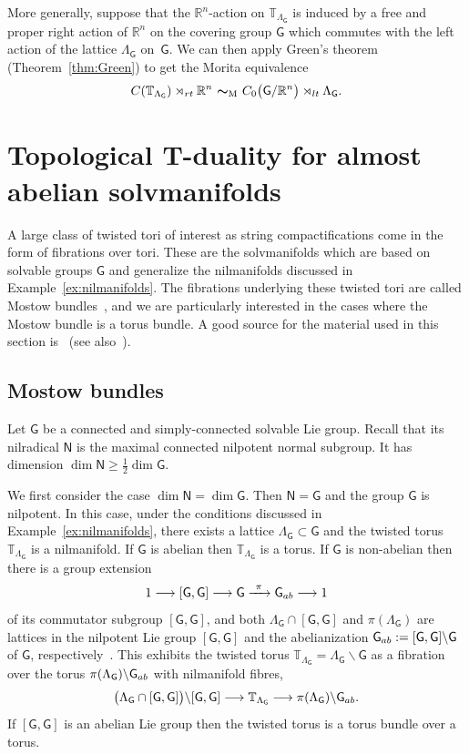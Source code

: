 \documentclass[11pt]{article}
\numberwithin{equation}{section}
\numberwithin{equation}{section}
\newcommand{\mbf}[1]{{\boldsymbol {#1} }}
\newcommand{\sfG}{\mathsf{G}}
\newcommand{\sfN}{\mathsf{N}}
\newcommand{\lt}{{\rm lt}}
\newcommand{\rt}{{\rm rt}}
\newcommand{\real}{{\mathbb R}} %
\newcommand{\torus}{{\mathbb T}} %
\begin{document}
\setcounter{equation}{2}
More generally, suppose that the $\real^n$-action on $\torus_{\Lambda_\sfG}$ is
induced by a free and proper right action of $\real^n$ on the covering group $\sfG$
which commutes with the left action of the lattice $\Lambda_\sfG$ on~$\sfG$. We can then apply Green's theorem
(Theorem~\ref{thm:Green}) to get the Morita
equivalence
\begin{gather}\label{scheme}
C(\torus_{\Lambda_\sfG})\rtimes_\rt \real^n \ \mbf\sim_{\text{\tiny M}} \
C_0\big(\sfG/\real^n\big)\rtimes_\lt \Lambda_\sfG .
\end{gather}

\setcounter{section}{3}
\section{Topological T-duality for almost abelian solvmanifolds}\label{sec:TdualityMostow}

A large class of twisted tori of interest as string compactifications
come in the form of fibrations over tori. These are the solvmanifolds
which are based on solvable groups $\sfG$ and generalize the
nilmanifolds discussed in Example~\ref{ex:nilmanifolds}. The fibrations
underlying these twisted tori are called {Mostow
 bundles}~\cite{Mostow1954}, and we are particularly interested in
the cases where the Mostow bundle is a torus bundle. A good source for
the material used in this section is~\cite{Bock2009} (see also~\cite{Console2016, OpreaTralle}).

\subsection{Mostow bundles}

Let $\sfG$ be
a connected and simply-connected solvable Lie group. Recall that its
nilradical $\sfN$ is the maximal connected nilpotent normal subgroup. It
has dimension $\dim\sfN\geq\frac12\dim\sfG$.

We first consider the case $\dim\sfN=\dim\sfG$. Then
$\sfN=\sfG$ and the group $\sfG$ is nilpotent. In this case, under the
conditions discussed in
Example~\ref{ex:nilmanifolds}, there exists a lattice
$\Lambda_\sfG\subset\sfG$ and the twisted torus $\torus_{\Lambda_\sfG}$ is a
nilmanifold. If $\sfG$ is abelian then $\torus_{\Lambda_\sfG}$ is a
torus. If $\sfG$ is non-abelian then there is a group extension
\[
1\longrightarrow [\sfG,\sfG]\longrightarrow\sfG\xrightarrow{ \ \pi \
}\sfG_{\rm ab}\longrightarrow 1
\]
of its commutator subgroup $[\sfG,\sfG]$,
and both $\Lambda_\sfG\cap[\sfG,\sfG]$ and $\pi(\Lambda_\sfG)$ are
lattices in the nilpotent Lie group $[\sfG,\sfG]$ and the
abelianization $\sfG_{\rm ab}:=[\sfG,\sfG]\backslash\sfG$ of $\sfG$, respectively~\cite{Corwin1990}. This exhibits
the twisted torus $\torus_{\Lambda_\sfG}=\Lambda_\sfG\backslash \sfG $ as a fibration over the torus
$\pi(\Lambda_\sfG)\backslash\sfG_{\rm ab}$ with
nilmanifold fibres,{\samepage
\[
\big(\Lambda_\sfG\cap[\sfG,\sfG]\big)\backslash[\sfG,\sfG] \longrightarrow \torus_{\Lambda_\sfG} \longrightarrow
\pi(\Lambda_\sfG)\backslash \sfG_{\rm ab} .
\]
If $[\sfG,\sfG]$ is an abelian Lie group then the twisted
torus is a torus bundle over a torus.}
\end{document}

